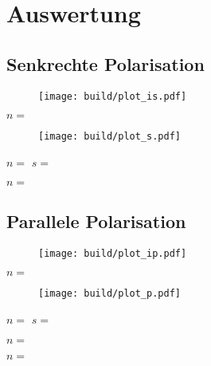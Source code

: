 \section{Auswertung}
\label{sec:auswertung}

\subsection{Senkrechte Polarisation}

\begin{figure}[H]
	\texttt{[image: build/plot\_is.pdf]}
	\caption{}
	\label{fig:plot_is}
\end{figure}

\begin{table}[H]
	\caption{}
	\makebox[\textwidth]{
		\centering
		}
	\label{tab:s}
\end{table}

$n = $

\begin{figure}[H]
	\texttt{[image: build/plot\_s.pdf]}
	\caption{}
	\label{fig:plot_s}
\end{figure}

$n = $ $s = $

$n = $

\subsection{Parallele Polarisation}

\begin{figure}[H]
	\texttt{[image: build/plot\_ip.pdf]}
	\caption{}
	\label{fig:plot_ip}
\end{figure}

\begin{table}[H]
	\caption{}
	\makebox[\textwidth]{
		\centering
		}
	\label{tab:p}
\end{table}

$n = $

\begin{figure}[H]
	\texttt{[image: build/plot\_p.pdf]}
	\caption{}
	\label{fig:plot_p}
\end{figure}

$n = $ $s = $

$n = $

$n = $
